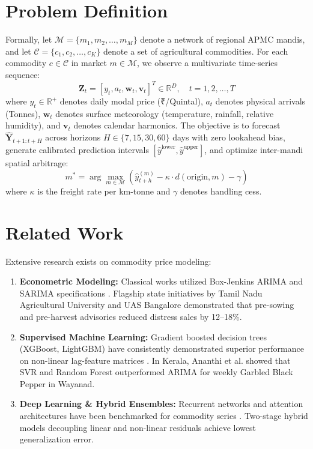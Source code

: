 \documentclass[journal,10pt,twocolumn]{IEEEtran}
\begin{document}
\section{Problem Definition}
Formally, let $\mathcal{M} = \{m_1, m_2, \dots, m_M\}$ denote a network of regional APMC mandis, and let $\mathcal{C} = \{c_1, c_2, \dots, c_K\}$ denote a set of agricultural commodities. For each commodity $c \in \mathcal{C}$ in market $m \in \mathcal{M}$, we observe a multivariate time-series sequence:
\begin{equation}
\mathbf{Z}_t = [y_t, a_t, \mathbf{w}_t, \mathbf{v}_t]^T \in \mathbb{R}^D, \quad t = 1, 2, \dots, T
\end{equation}
where $y_t \in \mathbb{R}^+$ denotes daily modal price (₹/Quintal), $a_t$ denotes physical arrivals (Tonnes), $\mathbf{w}_t$ denotes surface meteorology (temperature, rainfall, relative humidity), and $\mathbf{v}_t$ denotes calendar harmonics. The objective is to forecast $\hat{\mathbf{Y}}_{t+1:t+H}$ across horizons $H \in \{7, 15, 30, 60\}$ days with zero lookahead bias, generate calibrated prediction intervals $[\hat{y}^{\text{lower}}, \hat{y}^{\text{upper}}]$, and optimize inter-mandi spatial arbitrage:
\begin{equation}
m^* = \arg\max_{m \in \mathcal{M}} \left( \hat{y}_{t+h}^{(m)} - \kappa \cdot d(\text{origin}, m) - \gamma \right)
\end{equation}
where $\kappa$ is the freight rate per km-tonne and $\gamma$ denotes handling cess.

\section{Related Work}
Extensive research exists on commodity price modeling:
\begin{enumerate}
    \item \textbf{Econometric Modeling:} Classical works utilized Box-Jenkins ARIMA and SARIMA specifications \cite{mishra2021time}. Flagship state initiatives by Tamil Nadu Agricultural University \cite{tnau2018rkvy} and UAS Bangalore \cite{uasb2021market} demonstrated that pre-sowing and pre-harvest advisories reduced distress sales by 12--18\%.
    \item \textbf{Supervised Machine Learning:} Gradient boosted decision trees (XGBoost, LightGBM) have consistently demonstrated superior performance on non-linear lag-feature matrices \cite{aldahidi2023extreme, paul2022machine}. In Kerala, Ananthi et al. \cite{ananthi2020comparison} showed that SVR and Random Forest outperformed ARIMA for weekly Garbled Black Pepper in Wayanad.
    \item \textbf{Deep Learning \& Hybrid Ensembles:} Recurrent networks and attention architectures have been benchmarked for commodity series \cite{sabu2020predictive, lim2021time, zhang2023temporal}. Two-stage hybrid models decoupling linear and non-linear residuals \cite{liu2022agricultural, wang2022price} achieve lowest generalization error.
\end{enumerate}
\end{document}
